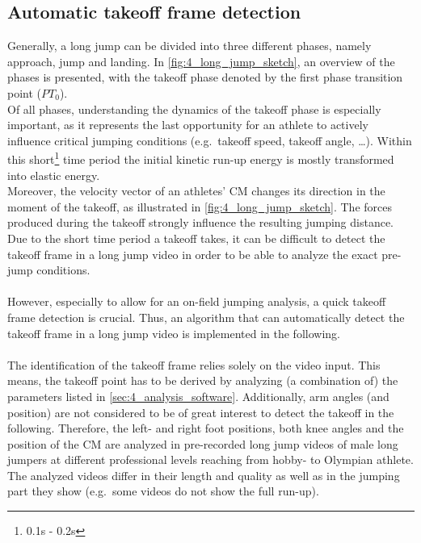 \subsection{Automatic takeoff frame detection}\label{subsec:4_takeoff_detection}
Generally, a long jump can be divided into three different phases, namely
approach, jump and landing.
In \autoref{fig:4_long_jump_sketch}, an overview of the phases is presented,
with the takeoff phase denoted by the first phase transition point ($PT_0$).\\
Of all phases, understanding the dynamics of the takeoff phase is especially
important, as it represents the last opportunity for an athlete to actively
influence critical jumping conditions (e.g.\ takeoff speed, takeoff angle,
\dots).
Within this short\footnote{0.1s - 0.2s\cite{mechanical_power_long_jump}} time
period the initial kinetic run-up energy is mostly transformed into elastic
energy\cite{wittersModelElasticTake1992}.\\
Moreover, the velocity vector of an athletes' \ac{CM} changes its direction
in the moment of the takeoff\cite{murakiJointTorquePower2008}, as illustrated in
\autoref{fig:4_long_jump_sketch}.
The forces produced during the takeoff strongly influence the resulting
jumping distance\cite{hayCitiusAltiusLongius1993}.\\
Due to the short time period a takeoff takes, it can be difficult to detect
the takeoff frame in a long jump video in order to be able to analyze the
exact pre-jump conditions.\\\\
However, especially to allow for an on-field jumping analysis, a quick takeoff
frame detection is crucial.
Thus, an algorithm that can automatically detect the takeoff frame in a long
jump video is implemented in the following.\\\\
The identification of the takeoff frame relies solely on the video input.
This means, the takeoff point has to be derived by analyzing (a combination
of) the parameters listed in \autoref{sec:4_analysis_software}.
Additionally, arm angles (and position) are not considered to be of great
interest to detect the takeoff in the following.
Therefore, the left- and right foot positions, both knee angles and the
position of the \ac{CM} are analyzed in pre-recorded long jump videos of male
long jumpers at different professional levels reaching from hobby- to Olympian
athlete.
The analyzed videos differ in their length and quality as well as in the
jumping part they show (e.g.\ some videos do not show the full run-up).

